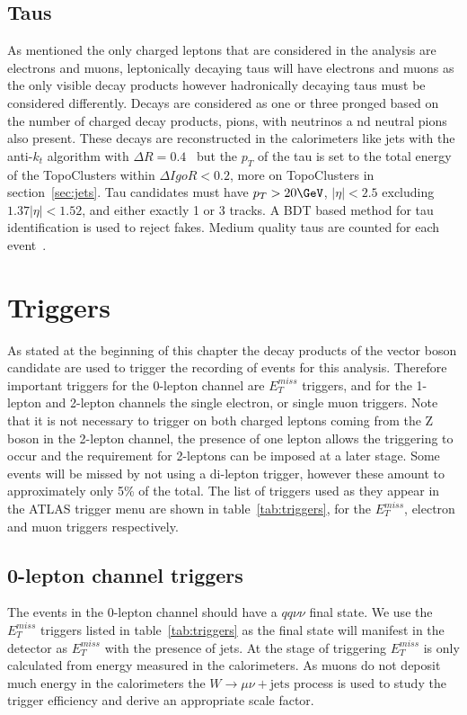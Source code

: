 \subsection{Taus}

As mentioned the only charged leptons that are considered in the analysis are
electrons and muons, leptonically decaying taus will have electrons and muons as
the only visible decay products however hadronically decaying taus must be
considered differently. Decays are considered as one or three pronged based on
the number of charged decay products, pions, with neutrinos a
nd neutral pions
also present. These decays are reconstructed in the calorimeters like jets with
the anti-$k_t$ algorithm with $\Delta R = 0.4$~\cite{tau-reco} but the $p_T$ of
the tau is set to the total energy of the TopoClusters within $\Delta I goR < 0.2$,
more on TopoClusters in section~\ref{sec:jets}. Tau candidates must have $p_T >
20 \GeV$, $\lvert  \eta \rvert < 2.5$ excluding $1.37 \lvert \eta \rvert < 1.52$,
and either exactly 1 or 3 tracks. A BDT based method for tau identification is
used to reject fakes. Medium quality taus are counted for each event~\cite{med-taus2}.

\section{Triggers}
\label{sec:triggers}

As stated at the beginning of this chapter the decay products of the vector
boson candidate are used to trigger the recording of events for this analysis.
Therefore important triggers for the 0-lepton channel are $E_T^{miss}$ triggers,
and for the 1-lepton and 2-lepton channels the single electron, or single muon
triggers. Note that it is not necessary to trigger on both charged leptons
coming from the Z boson in the 2-lepton channel, the presence of one lepton
allows the triggering to occur and the requirement for 2-leptons can be imposed
at a later stage. Some events will be missed by not using a di-lepton trigger,
however these amount to approximately only 5\% of the total. The list of
triggers used as they appear in the ATLAS trigger menu are shown in
table~\ref{tab:triggers}, for the $E_T^{miss}$, electron and muon triggers
respectively.


\subsection{0-lepton channel triggers}
The events in the 0-lepton channel should have a $qq\nu\nu$ final state. We use
the $E_T^{miss}$ triggers listed in table~\ref{tab:triggers} as the final state
will manifest in the detector as $E_T^{miss}$ with the presence of jets. At the
stage of triggering $E_T^{miss}$ is only calculated from energy measured in the
calorimeters. As muons do not deposit much energy in the calorimeters the $W
\rightarrow \mu \nu + \text{jets}$ process is used to study the trigger
efficiency and derive an appropriate scale factor.


